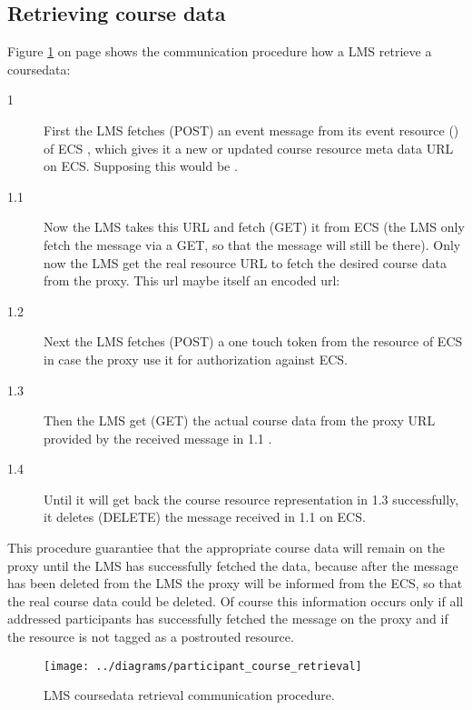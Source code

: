 \subsection{Retrieving course data}
Figure \ref{fig:participant_courselink_retrieval} on page
\pageref{fig:participant_courselink_retrieval} shows the communication procedure
how a LMS retrieve a coursedata:
\begin{description}
  \item[1] First the LMS fetches (POST)  an event message from its event resource
  () of ECS , which gives it a new or updated course
  resource meta data URL on ECS. Supposing this would be .
  \item[1.1] Now the LMS takes this URL and fetch (GET) it from ECS (the LMS
  only fetch the message via a GET, so that the message will still be there).
  Only now the LMS get the real resource URL to fetch the desired course data
  from the proxy. This url maybe itself an encoded url:
  \item[1.2] Next the LMS fetches (POST) a one touch token from the 
  resource of ECS in case the proxy use it for authorization against ECS.
  \item[1.3] Then the LMS get (GET) the actual course data from the proxy URL
  provided by the received message in 1.1 . 
  \item[1.4] Until it will get back the course resource representation in 1.3
  successfully, it deletes (DELETE) the message 
  received in 1.1 on ECS.
\end{description}
This procedure guarantiee that the appropriate course data will remain on the
proxy until the LMS has successfully fetched the data, because after the
message  has been deleted from the LMS the proxy
will be informed from the ECS, so that the real course data  could be deleted.
Of course this information occurs only if all addressed participants has
successfully fetched the message on the proxy and if the
 resource is not tagged as a postrouted resource. 

\begin{figure}[p]
\noindent \begin{centering}
\texttt{[image: ../diagrams/participant\_course\_retrieval]}
\par\end{centering}
\caption[LMS coursedata retrieval]{\label{fig:participant_courselink_retrieval}LMS coursedata retrieval communication procedure.}
\end{figure}
